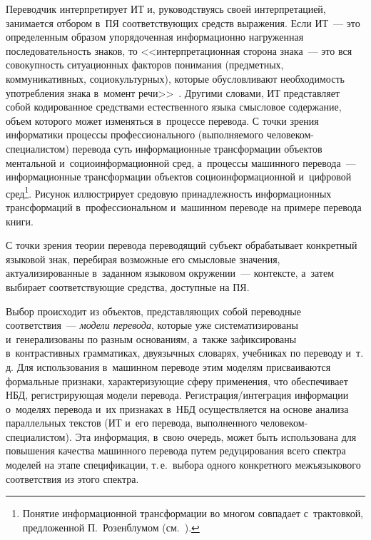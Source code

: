 \begin{multicols}{2}
{}
  
  Переводчик интерпретирует ИТ и, руководствуясь своей интерпретацией, 
занимается отбором в~ПЯ соответствующих средств выражения. Если ИТ~--- это 
определенным образом упорядоченная информационно нагруженная 
последовательность знаков, то <<интерпретационная сторона знака~--- это вся 
совокупность ситуационных факторов понимания (предметных, 
коммуникативных, социокультурных), которые обусловливают необходимость 
употребления знака в~момент речи>>~\cite[с.~25]{15-nur}. Другими словами, ИТ 
представляет собой кодированное средствами естественного языка смысловое 
содержание, объем которого может изменяться в~процессе перевода.
{%
%
}
  С точки зрения информатики процессы профессионального (выполняемого 
че\-ло\-ве\-ком-спе\-циа\-ли\-стом) перевода суть информационные трансформации 
объектов ментальной и~{социоинформационной} сред, а~процессы машинного 
перевода~--- информационные трансформации объектов социоинформационной 
и~цифровой сред\footnote{Понятие информационной трансформации во многом совпадает 
с~трактовкой, предложенной П.~Розенблумом (см.~\cite{16-nur, 17-nur}).}. 
Рисунок 
иллюстрирует средовую принадлежность информационных трансформаций 
в~профессиональном и~машинном переводе на примере перевода книги.




  С точки зрения теории перевода переводящий субъект обрабатывает 
конкретный языковой знак, перебирая возможные его смысловые значения, 
актуализированные в~заданном языковом окружении~--- контексте, а~затем 
выбирает соответствующие средства, доступные на ПЯ.
{

}
  
  Выбор происходит из объектов, пред\-став\-ля\-ющих собой переводные 
соответствия~--- \textit{модели перевода}, которые уже систематизированы 
и~генерализованы по разным основаниям, а~также зафиксированы 
в~контрастивных грамматиках, двуязычных словарях, учебниках по переводу 
и~т.\,д. Для использования в~машинном переводе этим моделям присваиваются 
формальные признаки, характеризующие сферу применения, что обеспечивает 
НБД, регистрирующая модели перевода. Регистрация/интеграция информации 
о~моделях перевода и~их признаках в~НБД осуществляется на основе анализа 
параллельных текстов (ИТ и~его перевода, выполненного человеком-специалистом). 
Эта информация, в~свою очередь, может быть использована для 
повышения качества машинного перевода путем редуцирования всего спектра 
моделей на этапе спецификации, т.\,е.\ выбора одного конкретного 
межъязыкового соответствия из этого спектра.
  

\end{multicols}
